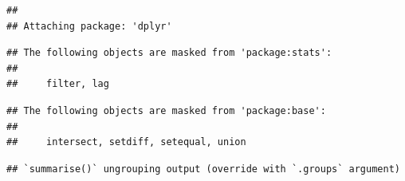 \documentclass[
]{article}
\newenvironment{Shaded}{\begin{snugshade}}{\end{snugshade}}
\newcommand{\ControlFlowTok}[1]{\textcolor[rgb]{0.13,0.29,0.53}{\textbf{#1}}}
\newcommand{\DataTypeTok}[1]{\textcolor[rgb]{0.13,0.29,0.53}{#1}}
\newcommand{\DecValTok}[1]{\textcolor[rgb]{0.00,0.00,0.81}{#1}}
\newcommand{\KeywordTok}[1]{\textcolor[rgb]{0.13,0.29,0.53}{\textbf{#1}}}
\newcommand{\NormalTok}[1]{#1}
\newcommand{\OperatorTok}[1]{\textcolor[rgb]{0.81,0.36,0.00}{\textbf{#1}}}
\newcommand{\StringTok}[1]{\textcolor[rgb]{0.31,0.60,0.02}{#1}}
\begin{document}
\begin{verbatim}
## 
## Attaching package: 'dplyr'
\end{verbatim}

\begin{verbatim}
## The following objects are masked from 'package:stats':
## 
##     filter, lag
\end{verbatim}

\begin{verbatim}
## The following objects are masked from 'package:base':
## 
##     intersect, setdiff, setequal, union
\end{verbatim}

\begin{Shaded}
\end{Shaded}

\begin{verbatim}
## `summarise()` ungrouping output (override with `.groups` argument)
\end{verbatim}
\end{document}
